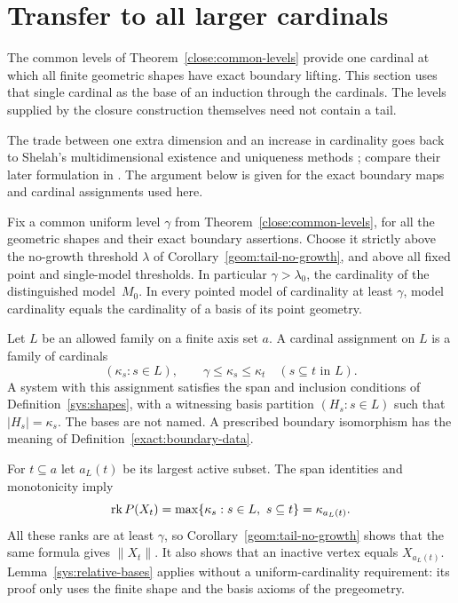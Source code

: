 \section{Transfer to all larger cardinals}
\label{tail:section-transfer}

The common levels of Theorem~\ref{close:common-levels} provide one
cardinal at which all finite geometric shapes have exact boundary
lifting.  This section uses that single cardinal as the base of an
induction through the cardinals.  The levels supplied by the closure
construction themselves need not contain a tail.

The trade between one extra dimension and an increase in cardinality
goes back to Shelah's multidimensional existence and uniqueness methods
\cite[Theorems~5.1--5.2]{Shelah1983B}; compare their later formulation in
\cite[Lemma~11.6]{ShelahVasey2024}. The argument below
is given for the exact boundary maps and cardinal assignments used here.

Fix a common uniform level $\gamma$ from
Theorem~\ref{close:common-levels}, for all the geometric shapes and
their exact boundary assertions.  Choose it strictly above the
no-growth threshold $\lambda$ of
Corollary~\ref{geom:tail-no-growth}, and above all fixed point and
single-model thresholds.  In particular $\gamma>\lambda_0$, the
cardinality of the distinguished model~$M_0$.  In every pointed
model of cardinality at least $\gamma$, model cardinality equals
the cardinality of a basis of its point geometry.

\begin{definition}
\label{tail:piece-cardinalities}
Let $L$ be an allowed family on a finite axis set $a$.  A cardinal
assignment on $L$ is a family of cardinals
\[
 (\kappa_s:s\in L),\qquad
 \gamma\leq\kappa_s\leq\kappa_t\quad(s\subseteq t\text{ in }L).
\]
A system with this assignment satisfies the span and inclusion
conditions of Definition~\ref{sys:shapes}, with a witnessing basis
partition $(H_s:s\in L)$ such that $|H_s|=\kappa_s$.
The bases are not named.  A prescribed boundary isomorphism has
the meaning of Definition~\ref{exact:boundary-data}.
\end{definition}

For $t\subseteq a$ let $a_L(t)$ be its largest active subset.
The span identities and monotonicity imply
\begin{equation}
 \rk P(X_t)=\max\{\kappa_s:s\in L,\ s\subseteq t\}
           =\kappa_{a_L(t)}.
 \label{tail:vertex-size}
\end{equation}
All these ranks are at least $\gamma$, so
Corollary~\ref{geom:tail-no-growth} shows that the same formula
gives $\|X_t\|$.  It also shows that an inactive vertex equals
$X_{a_L(t)}$.  Lemma~\ref{sys:relative-bases} applies without a
uniform-cardinality requirement: its proof only uses the finite
shape and the basis axioms of the pregeometry.

